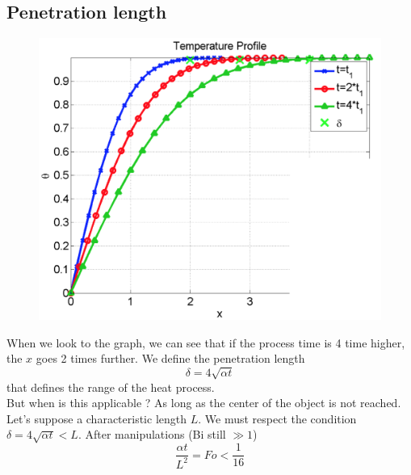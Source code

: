 	\subsection{Penetration length}
		\begin{figure}
		\vspace{-5mm}
		\includegraphics[scale=0.2]{ch4/4}
		\end{figure}	
		When we look to the graph, we can see that if the process time is 4 time higher, the $x$ goes 2 times further. We define the penetration length 
		\begin{equation}
			\delta = 4\sqrt{\alpha t}
		\end{equation}
		that defines the range of the heat process. \\
		But when is this applicable ? As long as the center of the object is not reached. Let's suppose a characteristic length $L$. We must respect the condition $\delta = 4\sqrt{\alpha t} < L$. After manipulations (Bi still $\gg 1$)
		\begin{equation}
			\frac{\alpha t}{L^2} = Fo < \frac{1}{16}
		\end{equation}
	
